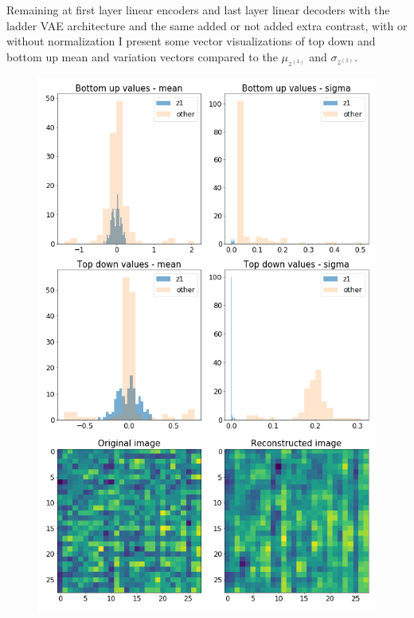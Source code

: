 \documentclass[12pt, english]{article}
\begin{document}
\vspace{4mm}

\par Remaining at first layer linear encoders and last layer linear decoders with the ladder VAE architecture and the same added or not added extra contrast, with or without normalization I present some vector visualizations of top down and bottom up mean and variation vectors compared to the $\mu_{z^{(1)}}$ and $\sigma_{z^{(1)}}$.

\vspace{4mm}

\begin{figure}[H]
  \begin{minipage}[b]{0.5\linewidth}
    \centering
    \includegraphics[width=.6\linewidth]{z1_vis/14_DenseLinLinLadderVAE_noContrastNorm_-stats-1_TD_BU_COMPS_1.png}
  \end{minipage}
  \begin{minipage}[b]{0.5\linewidth}
    \centering

\end{minipage}
\end{figure}
\end{document}
